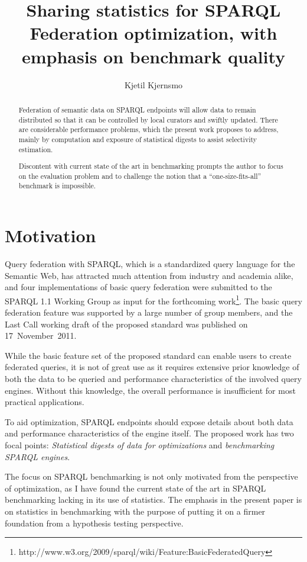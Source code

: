 \documentclass{llncs}
\title{Sharing statistics for SPARQL Federation optimization, with
  emphasis on benchmark quality}
\author{Kjetil Kjernsmo\inst{1}}
\institute{Department of Informatics,
Postboks 1080 Blindern,
0316 Oslo, Norway
\email{kjekje@ifi.uio.no}}
\begin{document}
\maketitle



\begin{abstract}
  Federation of semantic data on SPARQL endpoints will allow data to
  remain distributed so that it can be controlled by local curators
  and swiftly updated. There are considerable performance problems,
  which the present work proposes to address, mainly by computation
  and exposure of statistical digests to assist selectivity
  estimation.

  Discontent with current state of the art in benchmarking prompts the
  author to focus on the evaluation problem and to challenge the
  notion that a ``one-size-fits-all'' benchmark is impossible.
\end{abstract}

\section{Motivation}

Query federation with SPARQL, which is a standardized query language
for the Semantic Web, has attracted much attention
from industry and academia alike, and four implementations of basic
query federation were submitted to the SPARQL 1.1 Working Group as
input for the forthcoming
work\footnote{http://www.w3.org/2009/sparql/wiki/Feature:BasicFederatedQuery}. 
The basic query federation feature was
supported by a large number of group members, and the Last Call working
draft of the proposed standard was published on 17~November~2011.

While the basic feature set of the proposed standard can enable users
to create federated queries, it is not of great use as it requires
extensive prior knowledge of both the data to be queried and
performance characteristics of the involved query engines. Without
this knowledge, the overall performance is insufficient for most
practical applications.

To aid optimization, SPARQL endpoints should expose details about both
data and performance characteristics of the engine itself. The
proposed work has two focal points: \emph{Statistical digests of
  data for optimizations} and \emph{benchmarking SPARQL engines}. 

The focus on SPARQL benchmarking is not only motivated from the
perspective of optimization, as I have found the current state of the art
in SPARQL benchmarking lacking in its use of statistics. The emphasis
in the present paper is on statistics in benchmarking with the purpose
of putting it on a firmer foundation from a hypothesis testing
perspective.
\end{document}
